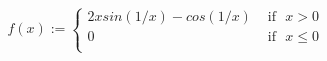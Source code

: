 \documentclass[preview]{standalone}
\begin{document}
\begin{align*}
f(x) := \begin{cases}2xsin(1/x)-cos(1/x)  &  \text{ if} \ \ \  x > 0 \\0 &  \text{ if} \ \ \ x \leq 0 \\\end{cases}
\end{align*}
\end{document}
